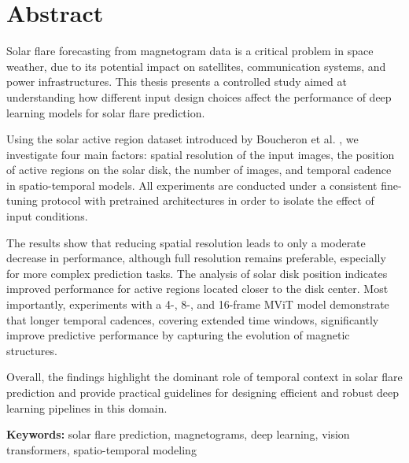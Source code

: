 \documentclass[12pt,twoside,maitrise]{dms}
\newenvironment{notocentry}{%
  \let\savedaddcontentsline\addcontentsline
  \renewcommand{\addcontentsline}[3]{}%
}{%
  \let\addcontentsline\savedaddcontentsline
}
\numberwithin{equation}{section}
\numberwithin{table}{chapter}
\numberwithin{figure}{chapter}
\begin{document}



\anglais
\begin{notocentry}
\chapter*{Abstract}

Solar flare forecasting from magnetogram data is a critical problem in space weather, due to its potential impact on satellites, communication systems, and power infrastructures. This thesis presents a controlled study aimed at understanding how different input design choices affect the performance of deep learning models for solar flare prediction.

Using the solar active region dataset introduced by Boucheron et al. \cite{ref_boucheron}, we investigate four main factors: spatial resolution of the input images, the position of active regions on the solar disk, the number of images, and temporal cadence in spatio-temporal models. All experiments are conducted under a consistent fine-tuning protocol with pretrained architectures in order to isolate the effect of input conditions.

The results show that reducing spatial resolution leads to only a moderate decrease in performance, although full resolution remains preferable, especially for more complex prediction tasks. The analysis of solar disk position indicates improved performance for active regions located closer to the disk center. Most importantly, experiments with a 4-, 8-, and 16-frame MViT model demonstrate that longer temporal cadences, covering extended time windows, significantly improve predictive performance by capturing the evolution of magnetic structures.

Overall, the findings highlight the dominant role of temporal context in solar flare prediction and provide practical guidelines for designing efficient and robust deep learning pipelines in this domain.

\textbf{Keywords:} solar flare prediction, magnetograms, deep learning, vision transformers, spatio-temporal modeling
\end{notocentry}
\end{document}
